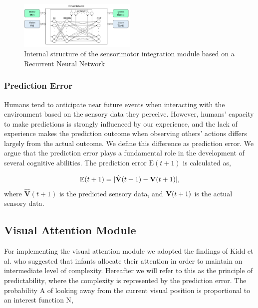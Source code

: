 \documentclass[conference]{IEEEtran}
\begin{document}
\begin{figure}[!t]
\centering
\includegraphics[width=0.5\textwidth,natwidth=700,natheight=450]{Elman_Network.png}
\caption{Internal structure of the sensorimotor integration module based on a Recurrent Neural Network}
\label{NeuralNet}
\end{figure}

\subsubsection{Prediction Error}
Humans tend to anticipate near future events when interacting with the environment based on the sensory data they perceive. However, humans' capacity to make predictions is strongly influenced by our experience, and the lack of experience makes the prediction outcome when observing others' actions differs largely from the actual outcome. We define this difference as prediction error. We argue that the prediction error plays a fundamental role in the development of several cognitive abilities. The prediction error \(\text{E}(t+1)\) is calculated as,

\begin{equation}
\begin{split}
	\text{E}(t+1)=|\hat{\textbf{V}}(t+1)-\text{\textbf{V}}(t+1)|,\\
\end{split}
\end{equation}
where \(\hat{\textbf{V}}(t+1)\)  is the predicted sensory data, and \(\text{\textbf{V}}(t+1)\) is the actual sensory data.

\subsection{Visual Attention Module}
For implementing the visual attention module we adopted the findings of Kidd et al. \cite{kidd2012goldilocks} who suggested that infants allocate their attention in order to maintain an intermediate level of complexity. Hereafter we will refer to this as the principle of predictability, where the complexity is represented by the prediction error. The probability \(\text{A}\) of looking away from the current visual position is proportional to an interest function \(\text{N}\),
\end{document}
